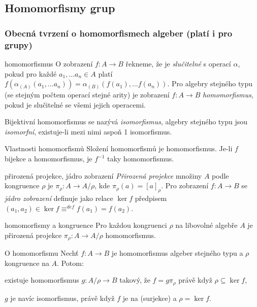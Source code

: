 \subsection{Homomorfismy grup}

\subsubsection*{Obecná tvrzení o homomorfismech algeber (platí i pro grupy)}

\begin{definiceN}{homomorfismus}
O zobrazení $f: A\to B$ řekneme, že je \emph{slučitelné} s operací $\alpha$, pokud pro každé $a_1,\dots a_n\in A$ platí $f(\alpha_{(A)}(a_1, ... a_n )) = \alpha_{(B)}( f(a_1), ... f(a_n) )$. Pro algebry stejného typu (se stejným počtem operací stejné arity) je zobrazení $f:A\to B$ \emph{homomorfismus}, pokud je slučitelné se všemi jejich operacemi.

Bijektivní homomorfismus se nazývá \emph{isomorfismus}, algebry stejného typu jsou \emph{isomorfní}, existuje-li mezi nimi aspoň 1 isomorfismus.
\end{definiceN}

\begin{poznamkaN}{Vlastnosti homomorfismů}
Složení homomorfismů je homomorfismus. Je-li $f$ bijekce a homomorfismus, je $f^{-1}$ taky homomorfismus.
\end{poznamkaN}

\begin{definiceN}{přirozená projekce, jádro zobrazení}
\emph{Přirozená projekce} množiny $A$ podle kongruence $\rho$ je $\pi_{\rho}: A\rightarrow A/\rho$, kde    $\pi_{\rho}(a) = [a]_{\rho}$. Pro zobrazení $f:A\to B$ se \emph{jádro zobrazení} definuje jako relace $\ker f$ předpisem $(a_1,a_2)\in \ker f \equiv^{def} f(a_1) = f(a_2)$.
\end{definiceN}

\begin{poznamkaN}{homomorfismy a kongruence}
Pro každou kongruenci $\rho$ na libovolné algebře $A$ je přirozená projekce $\pi_{\rho}:A\to A/\rho$ homomorfismus.
\end{poznamkaN}

\begin{vetaN}{O homomorfismu}
Nechť $f:A\to B$ je homomorfismus algeber stejného typu a $\rho$ kongruence na $A$. Potom:
\begin{penumerate}
    \item existuje homomorfismus $g:A/\rho\to B$ takový, že $f=g\pi_{\rho}$  právě když $\rho\subseteq \ker f$,
    \item $g$ je navíc isomorfismus, právě když $f$ je na (surjekce) a $\rho = \ker f$.
\end{penumerate}
\end{vetaN}

